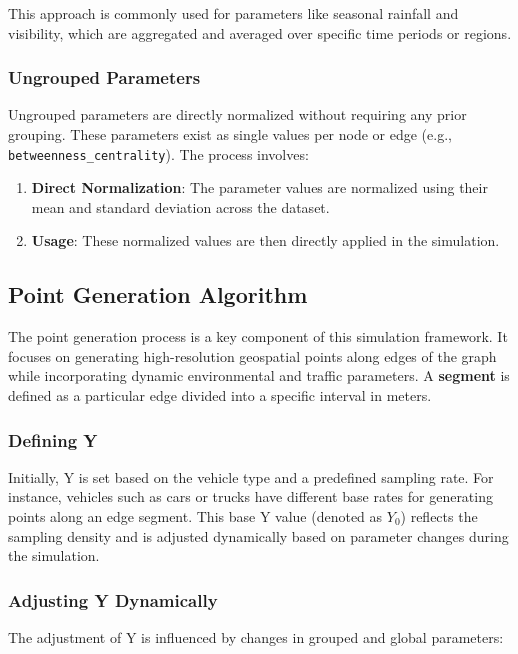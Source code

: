 \documentclass[sigplan,screen]{acmart}
\begin{document}
This approach is commonly used for parameters like seasonal rainfall and visibility, which are aggregated and averaged over specific time periods or regions.

\subsubsection{Ungrouped Parameters}
Ungrouped parameters are directly normalized without requiring any prior grouping. These parameters exist as single values per node or edge (e.g., \texttt{betweenness\_centrality}). The process involves:

\begin{enumerate}
    \item \textbf{Direct Normalization}: The parameter values are normalized using their mean and standard deviation across the dataset.
    \item \textbf{Usage}: These normalized values are then directly applied in the simulation.
\end{enumerate}

\subsection{Point Generation Algorithm}
The point generation process is a key component of this simulation framework. It focuses on generating high-resolution geospatial points along edges of the graph while incorporating dynamic environmental and traffic parameters. A \textbf{segment} is defined as a particular edge divided into a specific interval in meters.

\subsubsection{Defining Y}
Initially, Y is set based on the vehicle type and a predefined sampling rate. For instance, vehicles such as cars or trucks have different base rates for generating points along an edge segment. This base Y value (denoted as $Y_0$) reflects the sampling density and is adjusted dynamically based on parameter changes during the simulation.

\subsubsection{Adjusting Y Dynamically}
The adjustment of Y is influenced by changes in grouped and global parameters:
\end{document}
